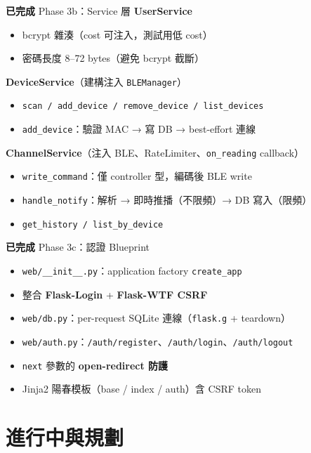 \documentclass[10pt,aspectratio=169]{beamer}
\newcommand{\dn}[1]{\textcolor{done}{\textbf{#1}}}
\begin{document}
\begin{frame}{\dn{已完成} Phase 3b：Service 層}
  \textbf{UserService}
  \begin{itemize}
    \item bcrypt 雜湊（cost 可注入，測試用低 cost）
    \item 密碼長度 8–72 bytes（避免 bcrypt 截斷）
  \end{itemize}

  \textbf{DeviceService}（建構注入 \texttt{BLEManager}）
  \begin{itemize}
    \item \texttt{scan / add\_device / remove\_device / list\_devices}
    \item \texttt{add\_device}：驗證 MAC → 寫 DB → best-effort 連線
  \end{itemize}

  \textbf{ChannelService}（注入 BLE、RateLimiter、\texttt{on\_reading} callback）
  \begin{itemize}
    \item \texttt{write\_command}：僅 controller 型，編碼後 BLE write
    \item \texttt{handle\_notify}：解析 → 即時推播（不限頻）→ DB 寫入（限頻）
    \item \texttt{get\_history / list\_by\_device}
  \end{itemize}
\end{frame}

\begin{frame}{\dn{已完成} Phase 3c：認證 Blueprint}
  \begin{itemize}
    \item \texttt{web/\_\_init\_\_.py}：application factory \texttt{create\_app}
    \item 整合 \textbf{Flask-Login} + \textbf{Flask-WTF CSRF}
    \item \texttt{web/db.py}：per-request SQLite 連線（\texttt{flask.g} + teardown）
    \item \texttt{web/auth.py}：\texttt{/auth/register}、\texttt{/auth/login}、\texttt{/auth/logout}
    \item \texttt{next} 參數的 \textbf{open-redirect 防護}
    \item Jinja2 陽春模板（base / index / auth）含 CSRF token
  \end{itemize}
\end{frame}

\section{進行中與規劃}
\end{document}
